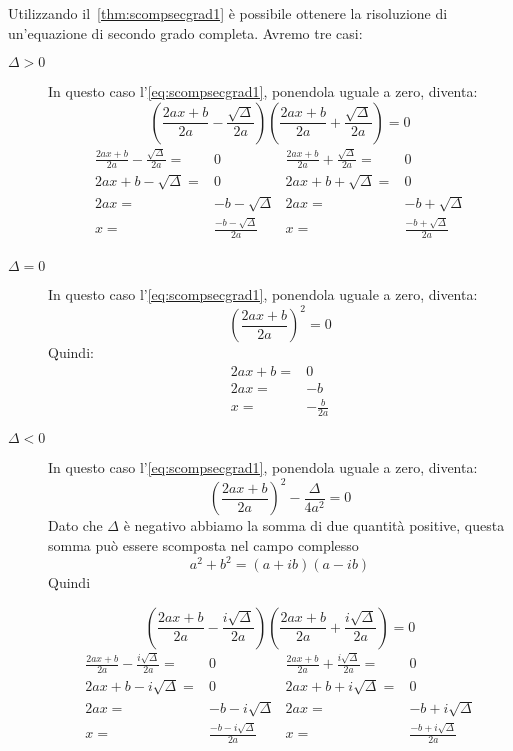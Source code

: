 \begin{comm}
	Utilizzando il~\cref{thm:scompsecgrad1} è possibile ottenere la risoluzione di un'equazione di secondo grado completa. Avremo tre casi:
	\begin{description}
		\item[$\Delta>0$]In questo caso l'\cref{eq:scompsecgrad1}, ponendola uguale a zero, diventa:  
		\begin{equation*}
		\left(\frac{2ax+b}{2a}-\frac{\sqrt{\Delta}}{2a}\right)\left(\frac{2ax+b}{2a}+\frac{\sqrt{\Delta}}{2a}\right)=0
		\end{equation*}
		\begin{align*}
		\frac{2ax+b}{2a}-\frac{\sqrt{\Delta}}{2a}=&0&\frac{2ax+b}{2a}+\frac{\sqrt{\Delta}}{2a}=&0\\
		2ax+b-\sqrt{\Delta}=&0&2ax+b+\sqrt{\Delta}=&0\\
		2ax=&-b-\sqrt{\Delta}&2ax=&-b+\sqrt{\Delta}\\
		x=&\frac{-b-\sqrt{\Delta}}{2a}&x=&\frac{-b+\sqrt{\Delta}}{2a}\\
		\end{align*}
	\item[$\Delta=0$]In questo caso l'\cref{eq:scompsecgrad1}, ponendola uguale a zero, diventa:
	\begin{equation}
	\left(\dfrac{2ax+b}{2a}\right)^2=0
	\end{equation}Quindi:
	\begin{align*}
	2ax+b=&0\\
	2ax=&-b\\
	x=&-\frac{b}{2a}
	\end{align*}
	\item[$\Delta<0$]In questo caso l'\cref{eq:scompsecgrad1}, ponendola uguale a zero, diventa:
	\begin{equation*}
	\left(\dfrac{2ax+b}{2a}\right)^2-\dfrac{\Delta}{4a^2}=0
	\end{equation*}
	Dato che $\Delta$ è negativo abbiamo la somma di due quantità positive, questa somma può essere scomposta nel campo complesso \[a^2+b^2=(a+ib)(a-ib)\] Quindi
	
		\begin{equation*}
	\left(\frac{2ax+b}{2a}-\frac{i\sqrt{\Delta}}{2a}\right)\left(\frac{2ax+b}{2a}+\frac{i\sqrt{\Delta}}{2a}\right)=0
	\end{equation*}
		\begin{align*}
	\frac{2ax+b}{2a}-\frac{i\sqrt{\Delta}}{2a}=&0&\frac{2ax+b}{2a}+\frac{i\sqrt{\Delta}}{2a}=&0\\
	2ax+b-i\sqrt{\Delta}=&0&2ax+b+i\sqrt{\Delta}=&0\\
	2ax=&-b-i\sqrt{\Delta}&2ax=&-b+i\sqrt{\Delta}\\
	x=&\frac{-b-i\sqrt{\Delta}}{2a}&x=&\frac{-b+i\sqrt{\Delta}}{2a}\\
	\end{align*}

	\end{description}
\end{comm}
